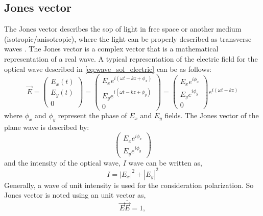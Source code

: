 \documentclass[../report.tex]{subfiles}
\begin{document}
\subsection{Jones vector}
The Jones vector describes the \gls{sop} of light in free space or another medium (isotropic/anisotropic), where the light can be properly described as transverse waves \cite{burch_introduction_1975}. The Jones vector is a complex vector that is a mathematical representation of a real wave. A typical representation of the electric field for the optical wave described in \ref{eq:wave_sol_electric} can be as follows:
\begin{equation}\label{eq:jones_vector}
\vec{E} = \left( \begin{matrix} E_{x}\left( t\right) \\ E_{y}\left( t\right) \\ 0\end{matrix} \right) = \left( \begin{matrix} E_{x}e^{i\left( \omega t - kz+\phi _{x}\right)} \\ E_{y}e^{i\left( \omega t - kz+\phi _{y}\right) }\\ 0\end{matrix} \right) = \left( \begin{matrix} E_{x}e^{i\phi_x}\\ E_{y}e^{i\phi_y}\\ 0 \end{matrix} \right)e^{i\left( \omega t - kz\right)} 
\end{equation}
where $\phi_x$ and $\phi_y$ represent the phase of $E_x$ and $E_y$ fields. The Jones vector of the plane wave is described by:
\begin{equation}\label{eq:jones_vector_form}
\left( \begin{matrix} E_{x}e^{i\phi_x}\\ E_{y}e^{i\phi_y}\end{matrix} \right) 
\end{equation}
and the intensity of the optical wave, $I$ wave can be written as,
\begin{equation}\label{eq:jones_vector_intensity}
I = \left| E_x\right| ^{2}+\left| E_y\right| ^{2} 
\end{equation}
Generally, a wave of unit intensity is used for the consideration polarization. So Jones vector is noted using an unit vector as,
\begin{equation}\label{eq:jones_unit_vector_form}
\vec{E}\overline {\vec{E}} = 1,
\end{equation}
\end{document}

